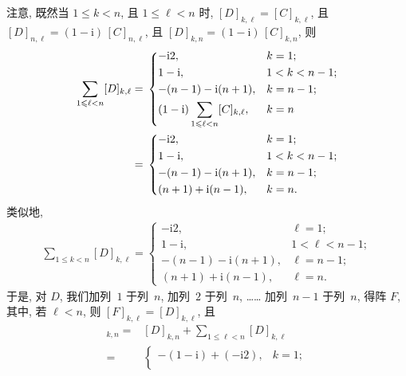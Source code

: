 \documentclass[../libro.tex]{subfiles}
\begin{document}
\begin{example}
    注意, 既然当 \(1 \leq k < n\), 且 \(1 \leq \ell < n\) 时,
    \([D]_{k,\ell} = [C]_{k,\ell}\),
    且 \([D]_{n,\ell} = (1 - \mathrm{i})\, [C]_{n,\ell}\),
    且 \([D]_{k,n} = (1 - \mathrm{i})\, [C]_{k,n}\),
    则
    \begin{align*}
        \sum_{1 \leq \ell < n} [D]_{k,\ell}
        = {} &
        \begin{dcases}
            -\mathrm{i} 2,                       & k = 1;         \\
            1 - \mathrm{i},                      & 1 < k < n - 1; \\
            -(n-1) - \mathrm{i} (n+1),           & k = n - 1;     \\
            (1 - \mathrm{i})
            \sum_{1 \leq \ell < n} [C]_{k,\ell}, & k = n
        \end{dcases}
        \\
        = {} &
        \begin{dcases}
            -\mathrm{i} 2,             & k = 1;         \\
            1 - \mathrm{i},            & 1 < k < n - 1; \\
            -(n-1) - \mathrm{i} (n+1), & k = n - 1;     \\
            (n+1) + \mathrm{i} (n-1),  & k = n.
        \end{dcases}
    \end{align*}
    类似地,
    \begin{align*}
        \sum_{1 \leq k < n} [D]_{k,\ell} =
        \begin{cases}
            -\mathrm{i} 2,             & \ell = 1;         \\
            1 - \mathrm{i},            & 1 < \ell < n - 1; \\
            -(n-1) - \mathrm{i} (n+1), & \ell = n - 1;     \\
            (n+1) + \mathrm{i} (n-1),  & \ell = n.
        \end{cases}
    \end{align*}
    于是, 对 \(D\),
    我们加列~\(1\) 于列~\(n\),
    加列~\(2\) 于列~\(n\),
    ……
    加列~\(n-1\) 于列~\(n\),
    得阵 \(F\),
    其中, 若 \(\ell < n\), 则 \([F]_{k,\ell} = [D]_{k,\ell}\),
    且
    \begin{align*}
        [F]_{k,n}
        = {} &
        [D]_{k,n} + \sum_{1 \leq \ell < n} [D]_{k,\ell}
        \\
        = {} &
        \begin{cases}
            -(1 - \mathrm{i}) + (-\mathrm{i} 2),                 & k = 1;         \\

\end{cases}
\end{align*}
\end{example}
\end{document}
